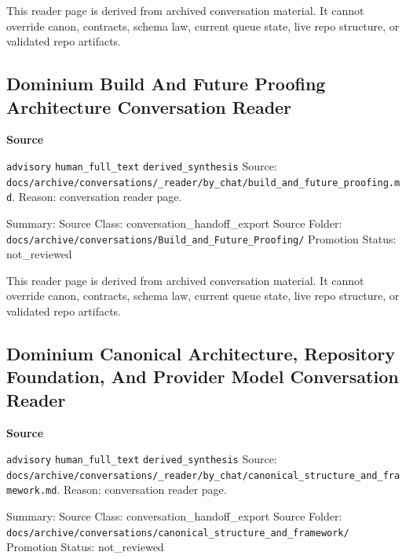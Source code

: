 \documentclass[9pt,a4paper,openany]{book}
\newcommand{\vonecallout}[3]{\par\medskip\noindent\begingroup\setlength{\fboxsep}{7pt}\colorbox{DomCalloutBg}{\parbox{0.94\linewidth}{\textbf{\textcolor{#1}{#2}}\par #3}}\endgroup\par\medskip}
\begin{document}
This reader page is derived from archived conversation material.\allowbreak{} It cannot override canon, contracts, schema law, current queue state, live repo structure, or validated repo artifacts.\allowbreak{}



\subsection{Dominium Build And Future Proofing Architecture Conversation Reader}

\vonecallout{DomSlate}{Source}{\texttt{advisory} \texttt{human\_\allowbreak{}full\_\allowbreak{}text} \texttt{derived\_\allowbreak{}synthesis} Source: \texttt{docs/\allowbreak{}archive/\allowbreak{}conversations/\allowbreak{}\_\allowbreak{}reader/\allowbreak{}by\_\allowbreak{}chat/\allowbreak{}build\_\allowbreak{}and\_\allowbreak{}future\_\allowbreak{}proofing.\allowbreak{}md}.\allowbreak{} Reason: conversation reader page.\allowbreak{}}

Summary: Source Class: conversation\_\allowbreak{}handoff\_\allowbreak{}export Source Folder: \texttt{docs/\allowbreak{}archive/\allowbreak{}conversations/\allowbreak{}Build\_\allowbreak{}and\_\allowbreak{}Future\_\allowbreak{}Proofing/\allowbreak{}} Promotion Status: not\_\allowbreak{}reviewed


This reader page is derived from archived conversation material.\allowbreak{} It cannot override canon, contracts, schema law, current queue state, live repo structure, or validated repo artifacts.\allowbreak{}



\subsection{Dominium Canonical Architecture, Repository Foundation, And Provider Model Conversation Reader}

\vonecallout{DomSlate}{Source}{\texttt{advisory} \texttt{human\_\allowbreak{}full\_\allowbreak{}text} \texttt{derived\_\allowbreak{}synthesis} Source: \texttt{docs/\allowbreak{}archive/\allowbreak{}conversations/\allowbreak{}\_\allowbreak{}reader/\allowbreak{}by\_\allowbreak{}chat/\allowbreak{}canonical\_\allowbreak{}structure\_\allowbreak{}and\_\allowbreak{}framework.\allowbreak{}md}.\allowbreak{} Reason: conversation reader page.\allowbreak{}}

Summary: Source Class: conversation\_\allowbreak{}handoff\_\allowbreak{}export Source Folder: \texttt{docs/\allowbreak{}archive/\allowbreak{}conversations/\allowbreak{}canonical\_\allowbreak{}structure\_\allowbreak{}and\_\allowbreak{}framework/\allowbreak{}} Promotion Status: not\_\allowbreak{}reviewed
\end{document}
